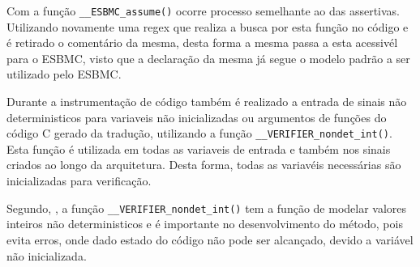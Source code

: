 \par
Com a função \texttt{\_\_ESBMC\_assume()} ocorre processo semelhante ao das assertivas. Utilizando novamente uma regex que realiza a busca por esta função no código e é retirado o comentário da mesma, desta forma a mesma passa a esta acessivél para o ESBMC, visto que a declaração da mesma já segue o modelo padrão a ser utilizado pelo ESBMC.

\par
Durante a instrumentação de código também é realizado a entrada de sinais não deterministicos para variaveis não inicializadas ou argumentos de funções do código C gerado da tradução, utilizando a função \texttt{\_\_VERIFIER\_nondet\_int()}. Esta função é utilizada em todas as variaveis de entrada e também nos sinais criados ao longo da arquitetura. Desta forma, todas as variavéis necessárias são inicializadas para verificação.

\par
Segundo, , a função \texttt{\_\_VERIFIER\_nondet\_int()} tem a função de modelar valores inteiros não deterministicos e é importante no desenvolvimento do método, pois evita erros, onde dado estado do código não pode ser alcançado, devido a variável não inicializada.

